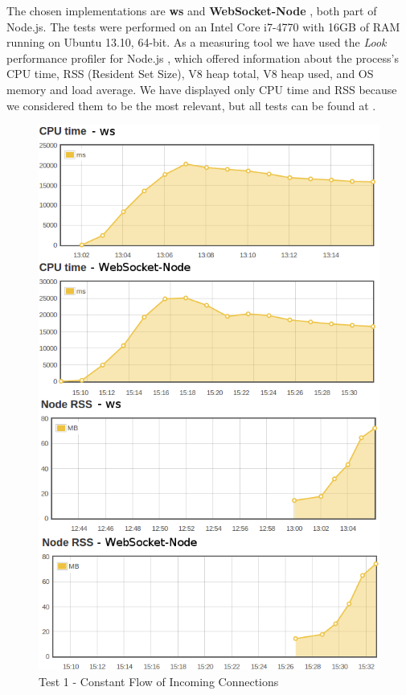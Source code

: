 \documentclass[conference]{IEEEtran}
\begin{document}
The chosen implementations are \textbf{ws} \cite{nodejs-ws}
and \textbf{WebSocket-Node} \cite{nodejs-websocket}, both part of Node.js. The
tests were performed on an Intel Core i7-4770 with 16GB of RAM running on Ubuntu
13.10, 64-bit. As a measuring tool we have used the \textit{Look} performance
profiler for Node.js \cite{nodejs-look}, which offered information about the
process's CPU time, RSS (Resident Set Size), V8 heap total, V8 heap used, and
OS memory and load average. We have displayed only CPU time and RSS because we
considered them to be the most relevant, but all tests can be found at \cite{tests}.
\begin{frame}{}
  \begin{figure}
    \centering
	\includegraphics[width=1\linewidth]{img/test1v2.png}
    \caption{Test 1 - Constant Flow of Incoming Connections}
  \end{figure}
\end{frame}
\\
\end{document}
